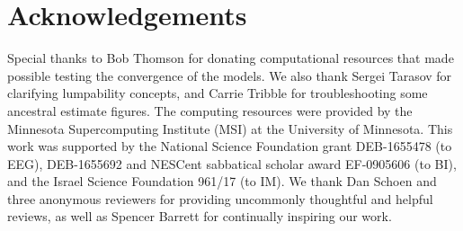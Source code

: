 \documentclass[11pt]{article}
\begin{document}
\section{Acknowledgements}
Special thanks to Bob Thomson for donating computational resources that made possible testing the convergence of the models. 
We also thank Sergei Tarasov for clarifying lumpability concepts, and Carrie Tribble for troubleshooting some ancestral estimate figures. 
The computing resources were provided by the Minnesota Supercomputing Institute (MSI) at the University of Minnesota.
This work was supported by the National Science Foundation grant DEB-1655478 (to EEG), DEB-1655692 and NESCent sabbatical scholar award EF-0905606 (to BI), and the Israel Science Foundation 961/17 (to IM). %
We thank Dan Schoen and three anonymous reviewers for providing uncommonly thoughtful and helpful reviews, as well as Spencer Barrett for continually inspiring our work.



\clearpage



\setstretch{\stretchby}
\end{document}
